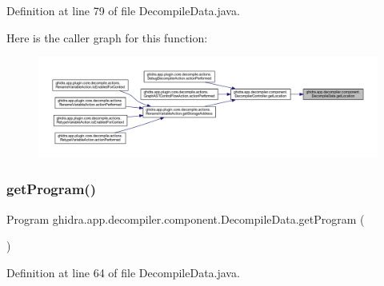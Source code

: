 Definition at line 79 of file Decompile\+Data.\+java.

Here is the caller graph for this function\+:
\nopagebreak
\begin{figure}[H]
\begin{center}
\leavevmode
\includegraphics[width=350pt]{classghidra_1_1app_1_1decompiler_1_1component_1_1_decompile_data_ac0b46cb708b62200beb3c11a0b2a42db_icgraph}
\end{center}
\end{figure}
\mbox{\label{classghidra_1_1app_1_1decompiler_1_1component_1_1_decompile_data_adbfd7703f02e3b05c83f394536058f05}} 
\subsubsection{\texorpdfstring{getProgram()}{getProgram()}}
{\footnotesize\ttfamily Program ghidra.\+app.\+decompiler.\+component.\+Decompile\+Data.\+get\+Program (\begin{DoxyParamCaption}{ }\end{DoxyParamCaption})\hspace{0.3cm}{\ttfamily [inline]}}



Definition at line 64 of file Decompile\+Data.\+java.

